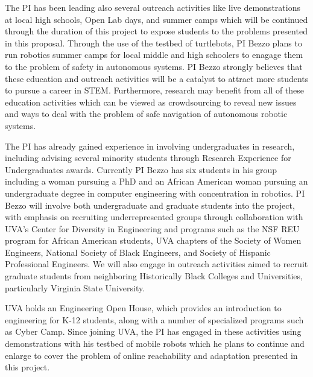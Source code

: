 The PI has been leading also several outreach activities like live demonstrations at local high schools, Open Lab days, and summer camps which will be continued through the duration of this project to expose students to the problems presented in this proposal. Through the use of the testbed of turtlebots, PI Bezzo plans to run robotics summer camps for local middle and high schoolers to enagage them to the problem of safety in autonomous systems.
PI Bezzo strongly believes that  these education and outreach activities will be a catalyst to attract more students to pursue a career in STEM. 
Furthermore, research may benefit from all of these education activities which can be viewed as crowdsourcing to reveal new issues and ways to deal with the problem of safe navigation of autonomous robotic systems.

 The PI has already gained experience in involving undergraduates in research, including advising several minority students through Research Experience for Undergraduates awards. Currently PI Bezzo has six students in his group including a woman pursuing a PhD and an African American woman pursuing an undergraduate degree in computer engineering with concentration in robotics. PI Bezzo will involve both undergraduate and graduate students into the project, with emphasis on recruiting underrepresented groups through collaboration with UVA's Center for Diversity in Engineering and programs such as the NSF REU program for African American students, UVA chapters of the Society of Women Engineers, National Society of Black Engineers, and Society of Hispanic Professional Engineers.  
We will also engage in outreach activities aimed to recruit graduate students from neighboring Historically Black Colleges and Universities, particularly Virginia State University.   

UVA holds an Engineering Open House, which provides an  introduction to engineering for K-12 students, along with a number of specialized programs such as Cyber Camp. Since joining UVA, the PI has engaged in these activities using demonstrations with his testbed of mobile robots which he plans to continue and enlarge to cover the problem of online reachability and adaptation presented in this project.

